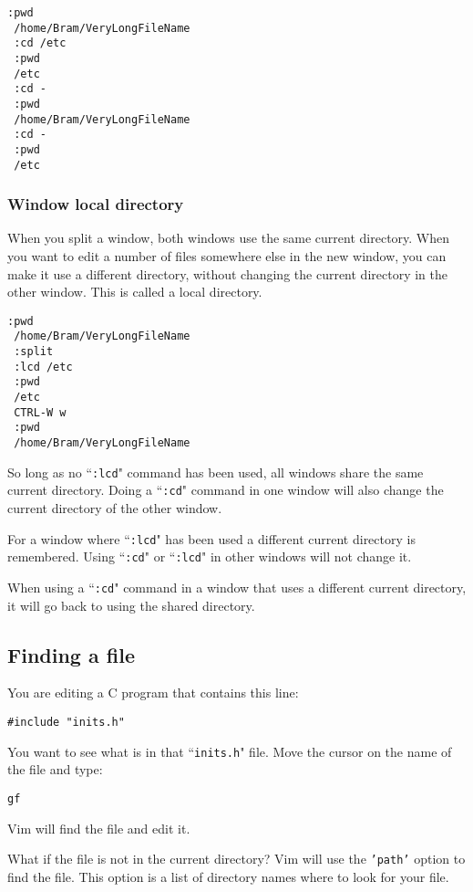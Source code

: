 \begin{Verbatim}[samepage=true]
 :pwd
 /home/Bram/VeryLongFileName
 :cd /etc
 :pwd
 /etc
 :cd -
 :pwd
 /home/Bram/VeryLongFileName
 :cd -
 :pwd
 /etc
\end{Verbatim}

\subsubsection{Window local directory}
When you split a window, both windows use the same current directory.
When you want to edit a number of files somewhere else in the new window, you can make it use a different directory, without changing the current directory in the other window.
This is called a local directory.

\begin{Verbatim}[samepage=true]
 :pwd
 /home/Bram/VeryLongFileName
 :split
 :lcd /etc
 :pwd
 /etc
 CTRL-W w
 :pwd
 /home/Bram/VeryLongFileName
\end{Verbatim}

So long as no ``\texttt{:lcd}" command has been used, all windows share the same current directory.
Doing a ``\texttt{:cd}" command in one window will also change the current directory of the other window.

For a window where ``\texttt{:lcd}" has been used a different current directory is remembered.
Using ``\texttt{:cd}" or ``\texttt{:lcd}" in other windows will not change it.

When using a ``\texttt{:cd}" command in a window that uses a different current directory, it will go back to using the shared directory.
\subsection{Finding a file}
You are editing a C program that contains this line:

\begin{Verbatim}[samepage=true]
    #include "inits.h" 
\end{Verbatim}

You want to see what is in that ``\texttt{inits.h}" file.
Move the cursor on the name of the file and type:

\begin{Verbatim}[samepage=true]
 gf
\end{Verbatim}

Vim will find the file and edit it.

What if the file is not in the current directory?  Vim will use the \texttt{'path'} option to find the file.
This option is a list of directory names where to look for your file.

